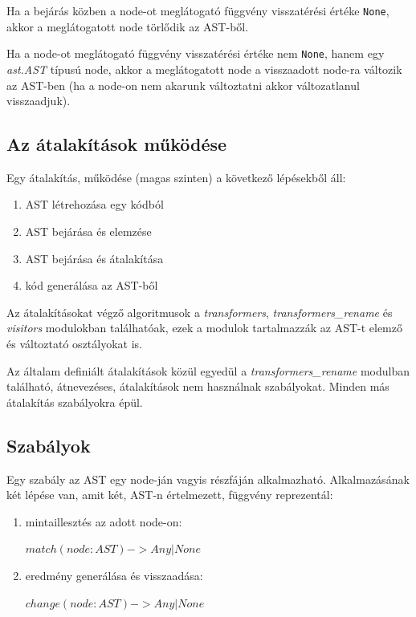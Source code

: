 Ha a bejárás közben a node-ot meglátogató függvény visszatérési értéke \texttt{None},
akkor a meglátogatott node törlődik az AST-ből.

Ha a node-ot meglátogató függvény visszatérési értéke nem \texttt{None},
hanem egy \emph{ast.AST} típusú node,
akkor a meglátogatott node a visszaadott node-ra változik az AST-ben
(ha a node-on nem akarunk változtatni akkor változatlanul visszaadjuk).

\subsection{Az átalakítások működése}

Egy átalakítás, működése (magas szinten) a következő lépésekből áll:

\begin{enumerate}
	\item AST létrehozása egy kódból
	\item AST bejárása és elemzése
	\item AST bejárása és átalakítása
	\item kód generálása az AST-ből
\end{enumerate}

Az átalakításokat végző algoritmusok a \emph{transformers}, \emph{transformers\_rename}
és \emph{visitors} modulokban találhatóak, ezek a modulok tartalmazzák az AST-t
elemző és változtató osztályokat is.

Az általam definiált átalakítások közül egyedül
a \emph{transformers\_rename} modulban található, átnevezéses,
átalakítások nem használnak szabályokat.
Minden más átalakítás szabályokra épül.

\subsection{Szabályok}

Egy szabály az AST egy node-ján vagyis részfáján alkalmazható.
Alkalmazásának két lépése van, amit két, AST-n értelmezett, függvény reprezentál:

\begin{enumerate}
	\item mintaillesztés az adott node-on:
	
	\(match(node: AST) -> Any | None \)
	
	\item eredmény generálása és visszaadása:
	
	\(change(node: AST) -> Any | None \)
\end{enumerate}

